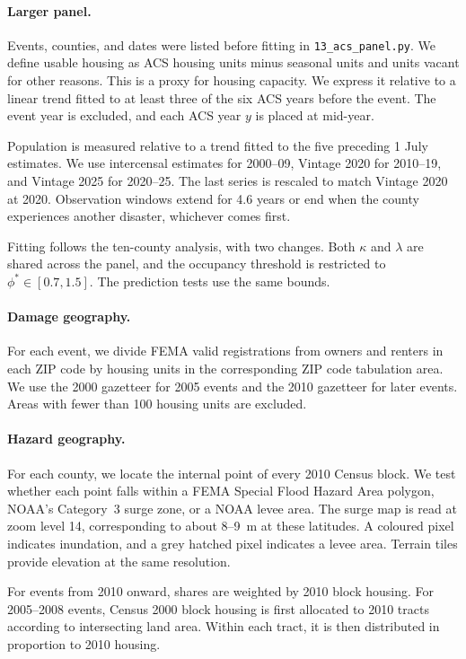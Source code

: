 \documentclass[11pt]{article}
\begin{document}
\paragraph{Larger panel.} Events, counties, and dates were listed before fitting in \texttt{13\_acs\_panel.py}. We define usable housing as ACS housing units minus seasonal units and units vacant for other reasons. This is a proxy for housing capacity. We express it relative to a linear trend fitted to at least three of the six ACS years before the event. The event year is excluded, and each ACS year $y$ is placed at mid-year.

Population is measured relative to a trend fitted to the five preceding 1 July estimates. We use intercensal estimates for 2000--09, Vintage 2020 for 2010--19, and Vintage 2025 for 2020--25. The last series is rescaled to match Vintage 2020 at 2020. Observation windows extend for 4.6 years or end when the county experiences another disaster, whichever comes first.

Fitting follows the ten-county analysis, with two changes. Both $\kappa$ and $\lambda$ are shared across the panel, and the occupancy threshold is restricted to $\phi^*\in[0.7,1.5]$. The prediction tests use the same bounds.

\paragraph{Damage geography.} For each event, we divide FEMA valid registrations from owners and renters in each ZIP code by housing units in the corresponding ZIP code tabulation area. We use the 2000 gazetteer for 2005 events and the 2010 gazetteer for later events. Areas with fewer than 100 housing units are excluded.

\paragraph{Hazard geography.} For each county, we locate the internal point of every 2010 Census block. We test whether each point falls within a FEMA Special Flood Hazard Area polygon, NOAA's Category~3 surge zone, or a NOAA levee area. The surge map is read at zoom level 14, corresponding to about 8--9~m at these latitudes. A coloured pixel indicates inundation, and a grey hatched pixel indicates a levee area. Terrain tiles provide elevation at the same resolution.

For events from 2010 onward, shares are weighted by 2010 block housing. For 2005--2008 events, Census 2000 block housing is first allocated to 2010 tracts according to intersecting land area. Within each tract, it is then distributed in proportion to 2010 housing.
\end{document}
